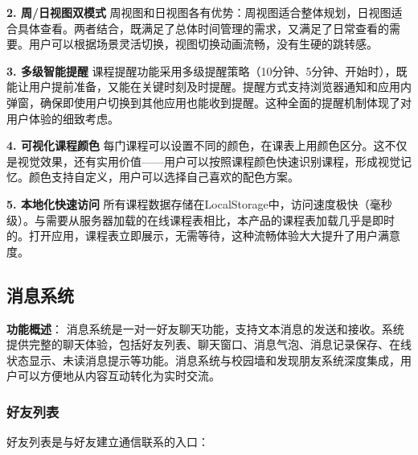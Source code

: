 \documentclass[12pt,a4paper]{article}
\begin{document}
\textbf{2. 周/日视图双模式}
周视图和日视图各有优势：周视图适合整体规划，日视图适合具体查看。两者结合，既满足了总体时间管理的需求，又满足了日常查看的需要。用户可以根据场景灵活切换，视图切换动画流畅，没有生硬的跳转感。

\textbf{3. 多级智能提醒}
课程提醒功能采用多级提醒策略（10分钟、5分钟、开始时），既能让用户提前准备，又能在关键时刻及时提醒。提醒方式支持浏览器通知和应用内弹窗，确保即使用户切换到其他应用也能收到提醒。这种全面的提醒机制体现了对用户体验的细致考虑。

\textbf{4. 可视化课程颜色}
每门课程可以设置不同的颜色，在课表上用颜色区分。这不仅是视觉效果，还有实用价值——用户可以按照课程颜色快速识别课程，形成视觉记忆。颜色支持自定义，用户可以选择自己喜欢的配色方案。

\textbf{5. 本地化快速访问}
所有课程数据存储在LocalStorage中，访问速度极快（毫秒级）。与需要从服务器加载的在线课程表相比，本产品的课程表加载几乎是即时的。打开应用，课程表立即展示，无需等待，这种流畅体验大大提升了用户满意度。

\subsection{消息系统}

\textbf{功能概述}：
消息系统是一对一好友聊天功能，支持文本消息的发送和接收。系统提供完整的聊天体验，包括好友列表、聊天窗口、消息气泡、消息记录保存、在线状态显示、未读消息提示等功能。消息系统与校园墙和发现朋友系统深度集成，用户可以方便地从内容互动转化为实时交流。

\subsubsection{好友列表}

好友列表是与好友建立通信联系的入口：
\end{document}
